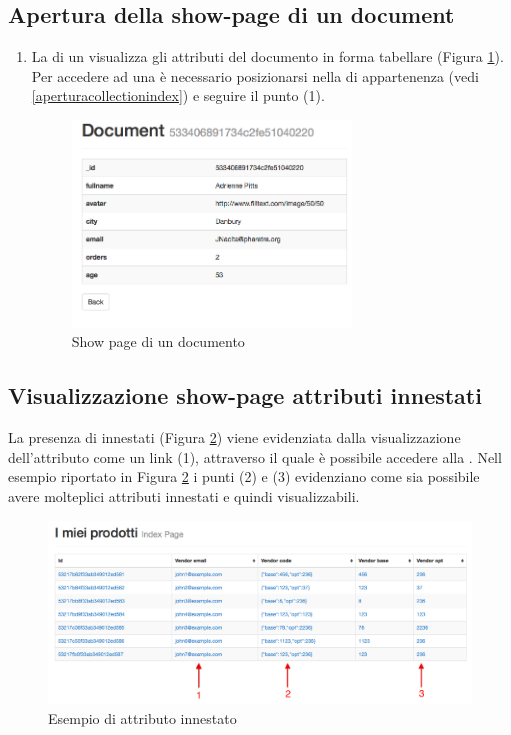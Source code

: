 	\clearpage
	\subsection{Apertura della show-page di un document} %
	\label{aperturashowpage}
		\begin{enumerate}
			\item La  di un  visualizza gli attributi del documento in forma tabellare (Figura \ref{fig:showpage}). Per accedere ad una  è necessario posizionarsi nella  di appartenenza (vedi \ref{aperturacollectionindex}) e seguire il punto (1).

			\begin{figure}[H]
				\centering \includegraphics[width=0.7\textwidth]{img/showpage.png}
			\caption{\label{fig:showpage} Show page di un documento}
			\end{figure}
		\end{enumerate}

	\clearpage
	\subsection{Visualizzazione show-page attributi innestati} %
			La presenza di  innestati (Figura \ref{fig:attributiInnestati}) viene evidenziata dalla visualizzazione dell'attributo come un link (1), attraverso il quale è possibile accedere alla . Nell esempio riportato in Figura \ref{fig:attributiInnestati} i punti (2) e (3) evidenziano come sia possibile avere molteplici attributi innestati e quindi visualizzabili.

			\begin{figure}[H]
				\centering \includegraphics[width=1\textwidth]{img/attributiInnestati.png}
			\caption{\label{fig:attributiInnestati} Esempio di attributo innestato}
			\end{figure}


